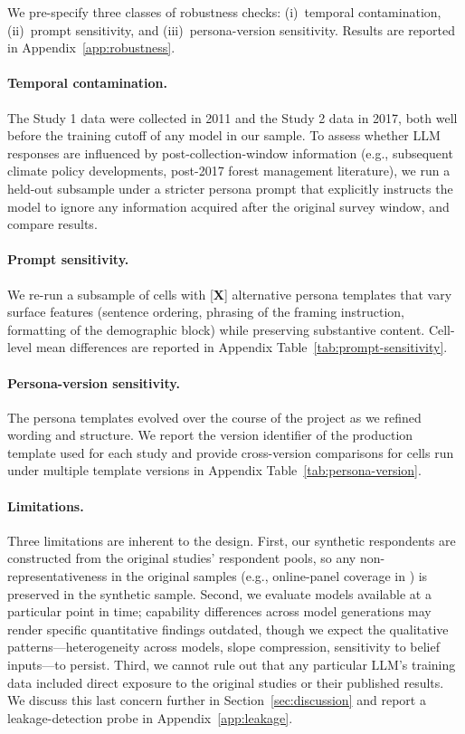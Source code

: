 \documentclass[12pt]{article}
\begin{document}
We pre-specify three classes of robustness checks: (i)~temporal contamination, (ii)~prompt sensitivity, and (iii)~persona-version sensitivity. Results are reported in Appendix~\ref{app:robustness}.

\paragraph{Temporal contamination.} The Study 1 data were collected in 2011 and the Study 2 data in 2017, both well before the training cutoff of any model in our sample. To assess whether LLM responses are influenced by post-collection-window information (e.g., subsequent climate policy developments, post-2017 forest management literature), we run a held-out subsample under a stricter persona prompt that explicitly instructs the model to ignore any information acquired after the original survey window, and compare results.

\paragraph{Prompt sensitivity.} We re-run a subsample of cells with [\textbf{X}] alternative persona templates that vary surface features (sentence ordering, phrasing of the framing instruction, formatting of the demographic block) while preserving substantive content. Cell-level mean differences are reported in Appendix Table~\ref{tab:prompt-sensitivity}.

\paragraph{Persona-version sensitivity.} The persona templates evolved over the course of the project as we refined wording and structure. We report the version identifier of the production template used for each study and provide cross-version comparisons for cells run under multiple template versions in Appendix Table~\ref{tab:persona-version}.

\paragraph{Limitations.} Three limitations are inherent to the design. First, our synthetic respondents are constructed from the original studies' respondent pools, so any non-representativeness in the original samples (e.g., online-panel coverage in \textcite{Giguere2020}) is preserved in the synthetic sample. Second, we evaluate models available at a particular point in time; capability differences across model generations may render specific quantitative findings outdated, though we expect the qualitative patterns---heterogeneity across models, slope compression, sensitivity to belief inputs---to persist. Third, we cannot rule out that any particular LLM's training data included direct exposure to the original studies or their published results. We discuss this last concern further in Section~\ref{sec:discussion} and report a leakage-detection probe in Appendix~\ref{app:leakage}.
\end{document}
